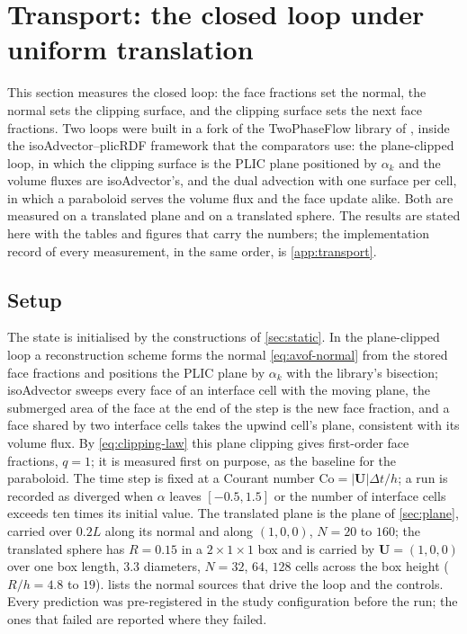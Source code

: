 \section{Transport: the closed loop under uniform translation}
\label{sec:tpf}

This section measures the closed loop: the face fractions set the normal, the normal sets the clipping surface, and the clipping surface sets the next face fractions. Two loops were built in a fork of the TwoPhaseFlow library of \citet{ScheuflerRoenby2023TwoPhaseFlow}, inside the isoAdvector--plicRDF framework \citep{RoenbyEtAl2016,ScheuflerRoenby2019} that the comparators use: the plane-clipped loop, in which the clipping surface is the PLIC plane positioned by $\alpha_k$ and the volume fluxes are isoAdvector's, and the dual advection with one surface per cell, in which a paraboloid serves the volume flux and the face update alike. Both are measured on a translated plane and on a translated sphere. The results are stated here with the tables and figures that carry the numbers; the implementation record of every measurement, in the same order, is \ref{app:transport}.

\subsection{Setup}
\label{sec:tpf-setup}

The state is initialised by the constructions of \cref{sec:static}. In the plane-clipped loop a reconstruction scheme forms the normal \cref{eq:avof-normal} from the stored face fractions and positions the PLIC plane by $\alpha_k$ with the library's bisection; isoAdvector sweeps every face of an interface cell with the moving plane, the submerged area of the face at the end of the step is the new face fraction, and a face shared by two interface cells takes the upwind cell's plane, consistent with its volume flux. By \cref{eq:clipping-law} this plane clipping gives first-order face fractions, $q = 1$; it is measured first on purpose, as the baseline for the paraboloid. The time step is fixed at a Courant number $\mathrm{Co} = |\mathbf{U}|\Delta t/h$; a run is recorded as diverged when $\alpha$ leaves $[-0.5, 1.5]$ or the number of interface cells exceeds ten times its initial value. The translated plane is the plane of \cref{sec:plane}, carried over $0.2L$ along its normal and along $(1, 0, 0)$, $N = 20$ to $160$; the translated sphere has $R = 0.15$ in a $2 \times 1 \times 1$ box and is carried by $\mathbf{U} = (1, 0, 0)$ over one box length, 3.3 diameters, $N = 32$, $64$, $128$ cells across the box height ($R/h = 4.8$ to $19$).  lists the normal sources that drive the loop and the controls. Every prediction was pre-registered in the study configuration before the run; the ones that failed are reported where they failed.

